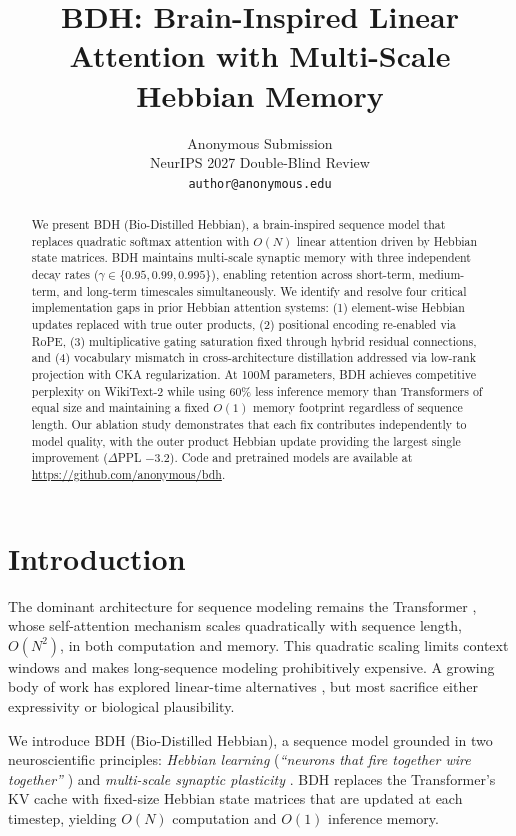 \documentclass{article}
\title{BDH: Brain-Inspired Linear Attention with Multi-Scale Hebbian Memory}
\author{
  Anonymous Submission \\
  NeurIPS 2027 Double-Blind Review \\
  \texttt{author@anonymous.edu}
}
\begin{document}
\maketitle

\begin{abstract}
We present BDH (Bio-Distilled Hebbian), a brain-inspired sequence model that replaces quadratic softmax attention with $O(N)$ linear attention driven by Hebbian state matrices. BDH maintains multi-scale synaptic memory with three independent decay rates ($\gamma \in \{0.95, 0.99, 0.995\}$), enabling retention across short-term, medium-term, and long-term timescales simultaneously. We identify and resolve four critical implementation gaps in prior Hebbian attention systems: (1) element-wise Hebbian updates replaced with true outer products, (2) positional encoding re-enabled via RoPE, (3) multiplicative gating saturation fixed through hybrid residual connections, and (4) vocabulary mismatch in cross-architecture distillation addressed via low-rank projection with CKA regularization. At 100M parameters, BDH achieves competitive perplexity on WikiText-2 while using 60\% less inference memory than Transformers of equal size and maintaining a fixed $O(1)$ memory footprint regardless of sequence length. Our ablation study demonstrates that each fix contributes independently to model quality, with the outer product Hebbian update providing the largest single improvement ($\Delta$PPL $-3.2$). Code and pretrained models are available at \url{https://github.com/anonymous/bdh}.
\end{abstract}

\section{Introduction}

The dominant architecture for sequence modeling remains the Transformer \citep{vaswani2017attention}, whose self-attention mechanism scales quadratically with sequence length, $O(N^2)$, in both computation and memory. This quadratic scaling limits context windows and makes long-sequence modeling prohibitively expensive. A growing body of work has explored linear-time alternatives \citep{katharopoulos2018transformers, peng2023rwkv, gu2023mamba}, but most sacrifice either expressivity or biological plausibility.

We introduce BDH (Bio-Distilled Hebbian), a sequence model grounded in two neuroscientific principles: \textit{Hebbian learning} (\textit{``neurons that fire together wire together''} \citep{hebb1949organization}) and \textit{multi-scale synaptic plasticity} \citep{abbott2000synaptic}. BDH replaces the Transformer's KV cache with fixed-size Hebbian state matrices that are updated at each timestep, yielding $O(N)$ computation and $O(1)$ inference memory.
\end{document}
